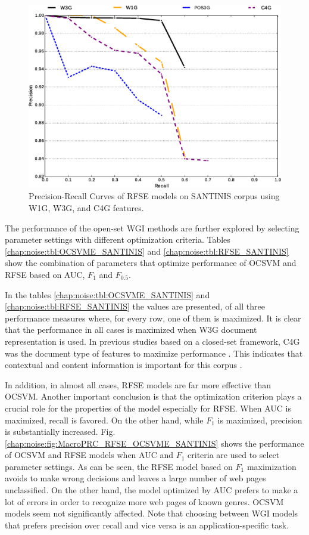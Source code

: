 \begin{figure}[H]
	\begin{center}
    \includegraphics[scale=0.45]{Figures/RFSE_Best_per_DocRep.eps}
	\caption{Precision-Recall Curves of RFSE models on SANTINIS corpus using W1G, W3G, and C4G features.}
	\label{chap:noise:fig:MacroPRC_RFSE_W3G_W1G_C4G_OPTIMAL_SANTINIS}
	\end{center}
\end{figure}

The performance of the open-set WGI methods are further explored by selecting parameter settings with different optimization criteria. Tables \ref{chap:noise:tbl:OCSVME_SANTINIS} and \ref{chap:noise:tbl:RFSE_SANTINIS} show the combination of parameters that optimize performance of OCSVM and RFSE based on AUC, $F_{1}$ and $F_{0.5}$. 

In the tables \ref{chap:noise:tbl:OCSVME_SANTINIS} and \ref{chap:noise:tbl:RFSE_SANTINIS} the values are presented, of all three performance measures where, for every row, one of them is maximized. It is clear that the performance in all cases is maximized when W3G document representation is used. In previous studies based on a closed-set framework, C4G was the document type of features to maximize performance \parencite{Sharroff2010}. This indicates that contextual and content information is important for this corpus \parencite{Asheghi2015}.

In addition, in almost all cases, RFSE models are far more effective than OCSVM. Another important conclusion is that the optimization criterion plays a crucial role for the properties of the model especially for RFSE. When AUC is maximized, recall is favored. On the other hand, while $F_{1}$ is maximized, precision is substantially increased. Fig. \ref{chap:noise:fig:MacroPRC_RFSE_OCSVME_SANTINIS} shows the performance of OCSVM and RFSE models when AUC and $F_{1}$ criteria are used to select parameter settings. As can be seen, the RFSE model based on $F_{1}$ maximization avoids to make wrong decisions and leaves a large number of web pages unclassified. On the other hand, the model optimized by AUC prefers to make a lot of errors in order to recognize more web pages of known genres. OCSVM models seem not significantly affected. Note that choosing between WGI models that prefers precision over recall and vice versa is an application-specific task.

